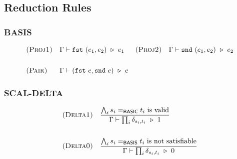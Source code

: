 \subsection{Reduction Rules}

\subsubsection*{\textsf{BASIS}}
\begin{align*}
    & \textsc{(Proj1)} && \Gamma \vdash \fst\ (e_1, e_2) \reduce e_1
    && \textsc{(Proj2)} && \Gamma \vdash \snd\ (e_1, e_2) \reduce e_2  \\
    \\
    & \textsc{(Pair)} && \Gamma \vdash (\fst\ e, \snd\ e)\reduce e
\end{align*}


\subsubsection*{\textsf{SCAL-DELTA}}
\begin{align*}
  & \textsc{(Delta1)} && 
  \frac{\bigwedge_i s_i =_\textsf{BASIC} t_i \textrm{ is valid}}{\Gamma \vdash \prod_i \delta_{s_i, t_i} \ \triangleright\  1}
  \\
  \\
  & \textsc{(Delta0)} && 
  \frac{\bigwedge_i s_i =_\textsf{BASIS} t_i \textrm{ is not satisfiable}}{\Gamma \vdash \prod_i \delta_{s_i, t_i} \ \triangleright\  0}
\end{align*}


